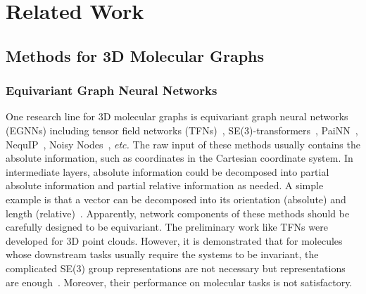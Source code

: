 \documentclass{article}
\begin{document}
\section{Related Work}



\subsection{Methods for 3D Molecular Graphs}  \label{sec:related_3dgn}
\subsubsection{Equivariant Graph Neural Networks}
One research line for 3D molecular graphs is equivariant graph neural networks (EGNNs) including
tensor field networks (TFNs)~\citep{thomas2018tensor},
SE(3)-transformers~\citep{fuchs2020se},
PaiNN~\citep{schutt2021equivariant},
NequIP~\citep{batzner2021se}, Noisy Nodes~\citep{godwin2021very}, \emph{etc.}
\textcolor{COLOR}{The raw input of 
these methods usually contains the absolute information, such as coordinates in the Cartesian coordinate system.
In intermediate layers, absolute information could be decomposed into partial absolute information and partial relative information as needed.
A simple example is that a vector can be decomposed into its orientation (absolute) and length (relative)~\citep{thomas2018tensor,schutt2021equivariant}.
Apparently, network components
of these methods should be carefully designed to be equivariant.}
The preliminary work like TFNs were developed for 3D point clouds.
However, it is demonstrated that for molecules whose downstream tasks usually require
the systems to be invariant, the complicated SE(3) group representations are not necessary but  representations are enough~\citep{klicpera2021gemnet}.
Moreover, their performance on molecular tasks is not satisfactory.
\end{document}
